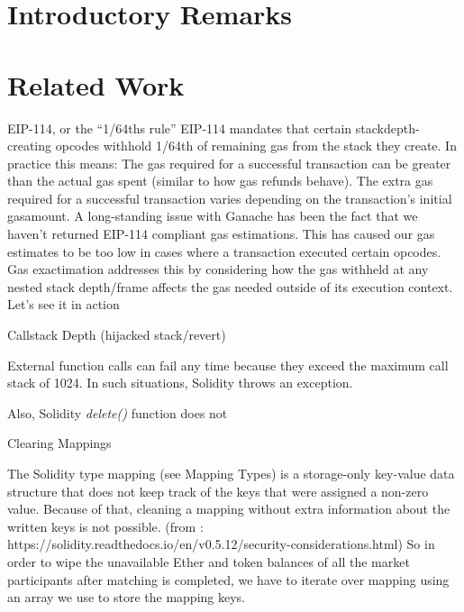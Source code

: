 

\section{Introductory Remarks}



\section{Related Work}






EIP-114, or the “1/64ths rule”
EIP-114 mandates that certain stackdepth-creating opcodes withhold 1/64th of remaining gas from the stack they create. In practice this means:
The gas required for a successful transaction can be greater than the actual gas spent (similar to how gas refunds behave).
The extra gas required for a successful transaction varies depending on the transaction’s initial gasamount.
A long-standing issue with Ganache has been the fact that we haven’t returned EIP-114 compliant gas estimations. This has caused our gas estimates to be too low in cases where a transaction executed certain opcodes. Gas exactimation addresses this by considering how the gas withheld at any nested stack depth/frame affects the gas needed outside of its execution context.
Let’s see it in action


Callstack Depth (hijacked stack/revert)

External function calls can fail any time because they exceed the maximum call stack of 1024. In such situations, Solidity throws an exception.





Also, Solidity \textit{delete()} function does not 



Clearing Mappings

The Solidity type mapping (see Mapping Types) is a storage-only key-value data structure that does not keep track of the keys that were assigned a non-zero value. Because of that, cleaning a mapping without extra information about the written keys is not possible. (from : https://solidity.readthedocs.io/en/v0.5.12/security-considerations.html) So in order to wipe the unavailable Ether and token balances of all the market participants after matching is completed, we have to iterate over mapping using an array we use to store the mapping keys.





